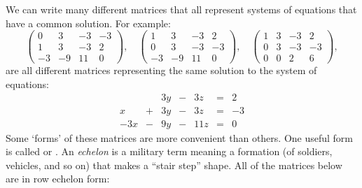 \documentclass{ximera}
\begin{document}
We can write many different matrices that all represent systems
of equations that have a common solution. For example:
\[
\begin{pmatrix}
 0 &   3 & -3 & -3 \\
  1 &   3 & -3 & 2  \\
  -3& -9  & 11 & 0
\end{pmatrix},
\quad
\begin{pmatrix}
  1 &   3 & -3 & 2  \\
  0 &   3 & -3 & -3 \\
  -3& -9  & 11 & 0
\end{pmatrix},
\quad
\begin{pmatrix}
  1 &   3 & -3 & 2  \\
  0 &   3 & -3 & -3 \\
  0& 0  & 2 & 6
\end{pmatrix},
\]
are all different matrices representing the same solution to the
system of equations:
\[
\begin{array}{ccccccc}
       & & 3y &-& 3z &=& 2 \\
     x& +&3y&-&3z&=&-3\\
     -3x& -&9y&-&11z&=&0
\end{array}
\]
Some `forms' of these matrices are more convenient than others. One
useful form is called  or . An \textit{echelon} is a military term meaning a formation
(of soldiers, vehicles, and so on) that makes a ``stair step''
shape. All of the matrices below are in row echelon form:
\end{document}
